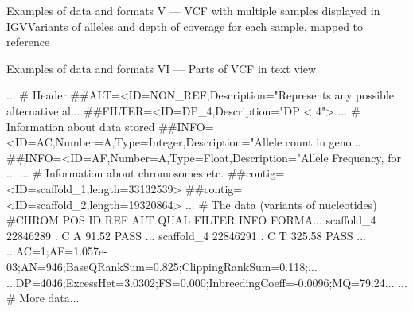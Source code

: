 \documentclass[compress, ucs, xelatex, 11pt, xcolor=svgnames, aspectratio=169,
	hyperref={
		bookmarks=true,
		unicode=true,
		colorlinks=true,
		pdftitle={Molecular data in R},
		plainpages=false,
		pdfauthor={Vojtech Zeisek},
		pdfsubject={Course about phylogeny and evolution in R},
		pdfcreator={XeLaTeX},
		pdfkeywords={R, evolution, phylogeny, molecular data},
		linkcolor=Crimson, %
		anchorcolor=Magenta, %
		citecolor=Magenta, %
		filecolor=Magenta, %
		menucolor=Magenta, %
		urlcolor=DodgerBlue, %
		pdftex},
	url={hyphens, lowtilde} %
	]{beamer}
\renewcommand{\texttt}[1]{\colorbox{Beige}{{\ttfamily #1}}}
\begin{document}
\begin{frame}{Examples of data and formats V --- VCF with multiple samples displayed in IGV}{Variants of alleles and depth of coverage for each sample, mapped to reference}
	\begin{center}
		\texttt{[image: vcf\_igv.png]}
	\end{center}
\end{frame}

\begin{frame}[fragile]{Examples of data and formats VI --- Parts of VCF in text view}
	\begin{spluscode}
    ... # Header
    ##ALT=<ID=NON_REF,Description="Represents any possible alternative al...
    ##FILTER=<ID=DP_4,Description="DP < 4">
    ... # Information about data stored
    ##INFO=<ID=AC,Number=A,Type=Integer,Description="Allele count in geno...
    ##INFO=<ID=AF,Number=A,Type=Float,Description="Allele Frequency, for ...
    ... # Information about chromosomes etc.
    ##contig=<ID=scaffold_1,length=33132539>
    ##contig=<ID=scaffold_2,length=19320864>
    ... # The data (variants of nucleotides)
    #CHROM  POS     ID      REF     ALT     QUAL    FILTER  INFO    FORMA...
    scaffold_4      22846289        .       C       A       91.52   PASS ...
    scaffold_4      22846291        .       C       T       325.58  PASS ...
    ...AC=1;AF=1.057e-03;AN=946;BaseQRankSum=0.825;ClippingRankSum=0.118;...
    ...DP=4046;ExcessHet=3.0302;FS=0.000;InbreedingCoeff=-0.0096;MQ=79.24...
    ... # More data...
	\end{spluscode}
\end{frame}
\end{document}

